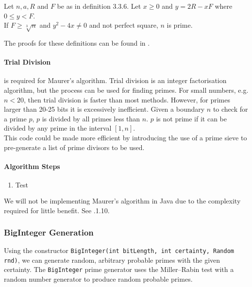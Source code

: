     \begin{mathdef}
      Let $n,a,R$ and $F$ be as in definition 3.3.6. Let $x \geq 0$ and $y = 2R - xF$ where $0 \leq y < F$. \\
      If $F \geq \sqrt[3]{n}$ and $y^2-4x \neq 0$ and not perfect square, $n$ is prime.
    \end{mathdef}
    
    The proofs for these definitions can be found in \cite{Maurer:1991aa}.
    
      \paragraph{Trial Division} 
      
      is required for Maurer's algorithm. Trial division is an integer factorisation algorithm, but the process can be used for finding primes. For small numbers, e.g. $n < 20$, then trial division is faster than most methods. However, for primes larger than 20-25 bits it is excessively inefficient\cite{Shwarz:2007aa}. Given a boundary $n$ to check for a prime $p$, $p$ is divided by all primes less than $n$. $p$ is not prime if it can be divided by any prime in the interval $[1,n]$. \\
      
      
      
      This code could be made more efficient by introducing the use of a prime sieve to pre-generate a list of prime divisors to be used.
      
      \paragraph{Algorithm Steps}
      
      \begin{enumerate}
        \item Test
      \end{enumerate}
      
      We will not be implementing Maurer's algorithm in Java due to the complexity required for little benefit. See .1.10.
    
    \subsubsection{BigInteger Generation}
    
    Using the constructor \verb!BigInteger(int bitLength, int certainty, Random rnd)!, we can generate random, arbitrary probable primes with the given certainty. The \verb!BigInteger! prime generator uses the Miller--Rabin test\cite{Java:2006ab} with a random number generator to produce random probable primes.
    
